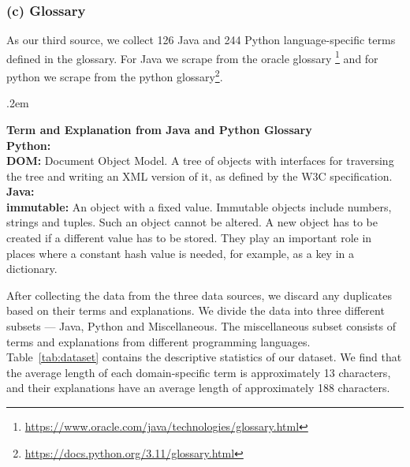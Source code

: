 \subsubsection{(c) Glossary}
As our third source, we collect 126 Java and 244 Python language-specific terms defined in the glossary. For Java we scrape from the oracle glossary \footnote{\url{https://www.oracle.com/java/technologies/glossary.html}\label{java-glossary}} and for python we scrape from the python glossary\footnote{\url{https://docs.python.org/3.11/glossary.html}\label{python-glossary}}.\par 
\FrameSep.2em
\begin{frshaded}
\label{glossarytag}
\noindent
\textbf{Term and Explanation from Java and Python Glossary}\\
\textbf{Python:} \\
\textbf{DOM:} Document Object Model. A tree of objects with interfaces for traversing the tree and writing an XML version of it, as defined by the W3C specification.\\
\textbf{Java:} \\ 
\textbf{immutable:} An object with a fixed value. Immutable objects include numbers, strings and tuples. Such an object cannot be altered.  A new object has to be created if a different value has to be stored.  They play an important role in places where a constant hash value is needed, for example, as a key in a dictionary.
 \end{frshaded}

After collecting the data from the three data sources, we discard any duplicates based on their terms and explanations. We divide the data into three different subsets --- Java, Python and Miscellaneous. The miscellaneous subset consists of terms and explanations from different programming languages. Table~\ref{tab:dataset} contains the descriptive statistics of our dataset. We find that the average length of each domain-specific term is approximately 13 characters, and their explanations have an average length of approximately 188 characters. \par

